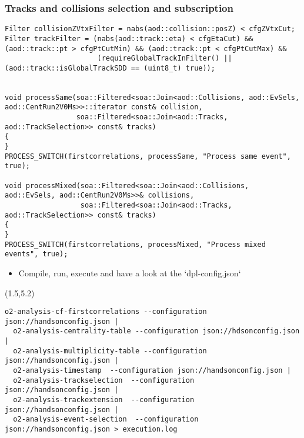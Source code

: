 \documentclass[14pt,aspectratio=169,t]{beamer}
\begin{document}
\begin{frame}[fragile]
  \frametitle{Tracks and collisions selection and subscription}
  \vspace{-0.1in}
  {\tiny\color{blue}
  \begin{verbatim}
Filter collisionZVtxFilter = nabs(aod::collision::posZ) < cfgZVtxCut;
Filter trackFilter = (nabs(aod::track::eta) < cfgEtaCut) && (aod::track::pt > cfgPtCutMin) && (aod::track::pt < cfgPtCutMax) &&
                      (requireGlobalTrackInFilter() || (aod::track::isGlobalTrackSDD == (uint8_t) true));


void processSame(soa::Filtered<soa::Join<aod::Collisions, aod::EvSels, aod::CentRun2V0Ms>>::iterator const& collision, 
                 soa::Filtered<soa::Join<aod::Tracks, aod::TrackSelection>> const& tracks)
{
}
PROCESS_SWITCH(firstcorrelations, processSame, "Process same event", true);

void processMixed(soa::Filtered<soa::Join<aod::Collisions, aod::EvSels, aod::CentRun2V0Ms>>& collisions, 
                  soa::Filtered<soa::Join<aod::Tracks, aod::TrackSelection>> const& tracks)
{
}
PROCESS_SWITCH(firstcorrelations, processMixed, "Process mixed events", true);
  \end{verbatim}}
  \vspace{-0.2in}
  \begin{itemize}
    \small
    \item Compile, run, execute and have a look at the `dpl-config.json`
  \end{itemize}
  \vspace{-0.4in}
  \begin{textblock}{16}(1.5,5.2)
    {\tiny \color{black}
    \vspace{-0.1in}
    \begin{verbatim}
o2-analysis-cf-firstcorrelations --configuration json://handsonconfig.json |  
  o2-analysis-centrality-table --configuration json://hdsonconfig.json | 
  o2-analysis-multiplicity-table --configuration json://handsonconfig.json | 
  o2-analysis-timestamp  --configuration json://handsonconfig.json | 
  o2-analysis-trackselection  --configuration json://handsonconfig.json | 
  o2-analysis-trackextension  --configuration json://handsonconfig.json | 
  o2-analysis-event-selection  --configuration json://handsonconfig.json > execution.log
    \end{verbatim}}
  \end{textblock}
\end{frame}
\end{document}
